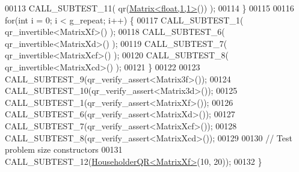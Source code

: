 \begin{DoxyCode}
00113    CALL\_SUBTEST\_11( qr(\hyperlink{group___core___module_class_eigen_1_1_matrix}{Matrix<float,1,1>}()) );
00114   \}
00115 
00116   \textcolor{keywordflow}{for}(\textcolor{keywordtype}{int} i = 0; i < g\_repeat; i++) \{
00117     CALL\_SUBTEST\_1( qr\_invertible<MatrixXf>() );
00118     CALL\_SUBTEST\_6( qr\_invertible<MatrixXd>() );
00119     CALL\_SUBTEST\_7( qr\_invertible<MatrixXcf>() );
00120     CALL\_SUBTEST\_8( qr\_invertible<MatrixXcd>() );
00121   \}
00122 
00123   CALL\_SUBTEST\_9(qr\_verify\_assert<Matrix3f>());
00124   CALL\_SUBTEST\_10(qr\_verify\_assert<Matrix3d>());
00125   CALL\_SUBTEST\_1(qr\_verify\_assert<MatrixXf>());
00126   CALL\_SUBTEST\_6(qr\_verify\_assert<MatrixXd>());
00127   CALL\_SUBTEST\_7(qr\_verify\_assert<MatrixXcf>());
00128   CALL\_SUBTEST\_8(qr\_verify\_assert<MatrixXcd>());
00129 
00130   \textcolor{comment}{// Test problem size constructors}
00131   CALL\_SUBTEST\_12(\hyperlink{group___q_r___module_class_eigen_1_1_householder_q_r}{HouseholderQR<MatrixXf>}(10, 20));
00132 \}
\end{DoxyCode}
